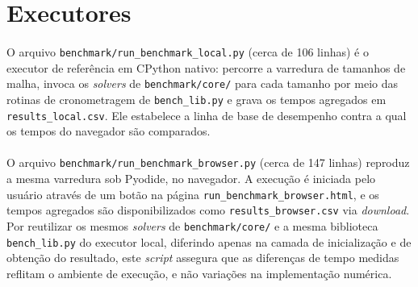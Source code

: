 \section{Executores}
\label{ap:bench_runners}

\paragraph{}O arquivo \texttt{benchmark/run\_benchmark\_local.py} (cerca de 106 linhas) é o executor de referência em CPython nativo: percorre a varredura de tamanhos de malha, invoca os \textit{solvers} de \texttt{benchmark/core/} para cada tamanho por meio das rotinas de cronometragem de \texttt{bench\_lib.py} e grava os tempos agregados em \texttt{results\_local.csv}. Ele estabelece a linha de base de desempenho contra a qual os tempos do navegador são comparados.

\paragraph{}O arquivo \texttt{benchmark/run\_benchmark\_browser.py} (cerca de 147 linhas) reproduz a mesma varredura sob Pyodide, no navegador. A execução é iniciada pelo usuário através de um botão na página \texttt{run\_benchmark\_browser.html}, e os tempos agregados são disponibilizados como \texttt{results\_browser.csv} via \textit{download}. Por reutilizar os mesmos \textit{solvers} de \texttt{benchmark/core/} e a mesma biblioteca \texttt{bench\_lib.py} do executor local, diferindo apenas na camada de inicialização e de obtenção do resultado, este \textit{script} assegura que as diferenças de tempo medidas reflitam o ambiente de execução, e não variações na implementação numérica.
